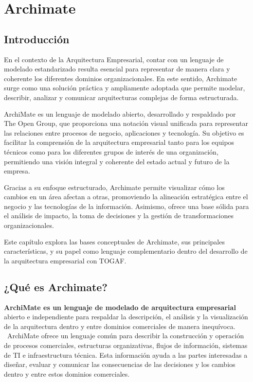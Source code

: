 \chapter{Archimate}{
    \section{Introducción}
    En el contexto de la Arquitectura Empresarial, contar con un lenguaje de modelado estandarizado resulta esencial para representar de manera clara y coherente los diferentes dominios organizacionales. En este sentido, Archimate surge como una solución práctica y ampliamente adoptada que permite modelar, describir, analizar y comunicar arquitecturas complejas de forma estructurada.

    ArchiMate es un lenguaje de modelado abierto, desarrollado y respaldado por The Open Group, que proporciona una notación visual unificada para representar las relaciones entre procesos de negocio, aplicaciones y tecnología. Su objetivo es facilitar la comprensión de la arquitectura empresarial tanto para los equipos técnicos como para los diferentes grupos de interés de una organización, permitiendo una visión integral y coherente del estado actual y futuro de la empresa.

    Gracias a su enfoque estructurado, Archimate permite visualizar cómo los cambios en un área afectan a otras, promoviendo la alineación estratégica entre el negocio y las tecnologías de la información. Asimismo, ofrece una base sólida para el análisis de impacto, la toma de decisiones y la gestión de transformaciones organizacionales.

    Este capítulo explora las bases conceptuales de Archimate, sus principales características, y su papel como lenguaje complementario dentro del desarrollo de la arquitectura empresarial con TOGAF.
	\section{¿Qué es Archimate?}
    \textbf{ArchiMate es un lenguaje de modelado de arquitectura empresarial} abierto e independiente para respaldar la descripción, el análisis y la visualización de la arquitectura dentro y entre dominios comerciales de manera inequívoca.\\\
    ArchiMate ofrece un lenguaje común para describir la construcción y operación de procesos comerciales, estructuras organizativas, flujos de información, sistemas de TI e infraestructura técnica. Esta información ayuda a las partes interesadas a diseñar, evaluar y comunicar las consecuencias de las decisiones y los cambios dentro y entre estos dominios comerciales. \cite{Archimate_definition}
}
